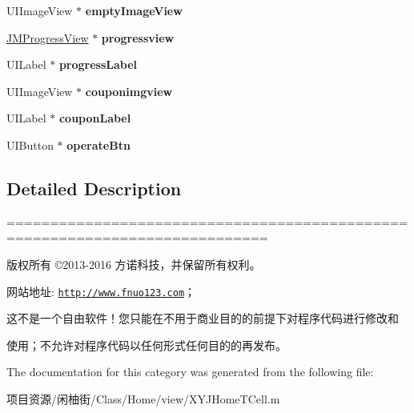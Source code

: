 \begin{DoxyCompactItemize}
\item 
\mbox{\label{category_x_y_j_home_t_cell_07_08_a1e9b333b5deb3b8606e86b64c0c1e3ab}} 
U\+I\+Image\+View $\ast$ {\bfseries empty\+Image\+View}
\item 
\mbox{\label{category_x_y_j_home_t_cell_07_08_a402e1b3436e3ffb9b5152273824e40da}} 
\mbox{\hyperlink{interface_j_m_progress_view}{J\+M\+Progress\+View}} $\ast$ {\bfseries progressview}
\item 
\mbox{\label{category_x_y_j_home_t_cell_07_08_a65ddaeece0182359e92b9f32736b0449}} 
U\+I\+Label $\ast$ {\bfseries progress\+Label}
\item 
\mbox{\label{category_x_y_j_home_t_cell_07_08_ac660017346beff5df9b20428fcb2c2d4}} 
U\+I\+Image\+View $\ast$ {\bfseries couponimgview}
\item 
\mbox{\label{category_x_y_j_home_t_cell_07_08_afc35742347fc87397a23c843c8b8208e}} 
U\+I\+Label $\ast$ {\bfseries coupon\+Label}
\item 
\mbox{\label{category_x_y_j_home_t_cell_07_08_ac0e17eac501ee4b87192b31be7cf5a91}} 
U\+I\+Button $\ast$ {\bfseries operate\+Btn}
\end{DoxyCompactItemize}


\subsection{Detailed Description}
============================================================================

版权所有 ©2013-\/2016 方诺科技，并保留所有权利。

网站地址\+: \href{http://www.fnuo123.com}{\tt http\+://www.\+fnuo123.\+com}； 



这不是一个自由软件！您只能在不用于商业目的的前提下对程序代码进行修改和

使用；不允许对程序代码以任何形式任何目的的再发布。 

 

The documentation for this category was generated from the following file\+:\begin{DoxyCompactItemize}
\item 
项目资源/闲柚街/\+Class/\+Home/view/X\+Y\+J\+Home\+T\+Cell.\+m\end{DoxyCompactItemize}
